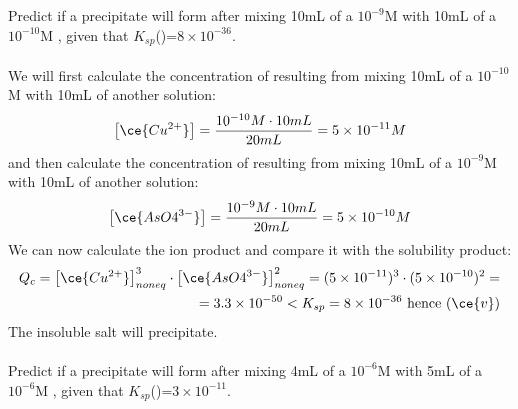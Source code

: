 \documentclass[main.tex]{subfiles}
\begin{document}
\begin{description}
\begin{example} %
Predict if a  precipitate will form after mixing 10mL of a $10^{-9}$M  with 10mL of a $10^{-10}$M , given that $K_{sp}$()=$8\times10^{-36}$.
\\
\\
We will first calculate the concentration of  resulting from mixing 10mL of a $10^{-10}$M  with 10mL of another solution:
\begin{equation*}\big[ \ce{Cu^{2+}} \big]=\frac{10^{-10}M\cdot 10mL}{20mL}=5\times 10^{-11}M\end{equation*}
and then calculate the concentration of  resulting from mixing 10mL of a $10^{-9}$M  with 10mL of another solution:
\begin{equation*}\big[ \ce{AsO4^{3-}} \big]=\frac{10^{-9}M\cdot 10mL}{20mL}=5\times 10^{-10}M\end{equation*}
We can now calculate the ion product and compare it with the solubility product:
\begin{equation*}\begin{split}Q_{c}=\big[ \ce{Cu^{2+}} \big]^3_{noneq}\cdot \big[ \ce{AsO4^{3-}} \big]^2_{noneq}=(5\times 10^{-11})^3\cdot(5\times 10^{-10})^2=\\=3.3\times 10^{-50}< K_{sp}=8\times10^{-36} \text{ hence } (\ce{v})	\end{split}\end{equation*}
The insoluble salt will precipitate.
 \\
\faDiamond\ \\
Predict if a  precipitate will form after mixing 4mL of a $10^{-6}$M  with 5mL of a $10^{-6}$M , given that $K_{sp}$()=$3\times10^{-11}$.
\\
\end{example}%


\end{description}
\end{document}
